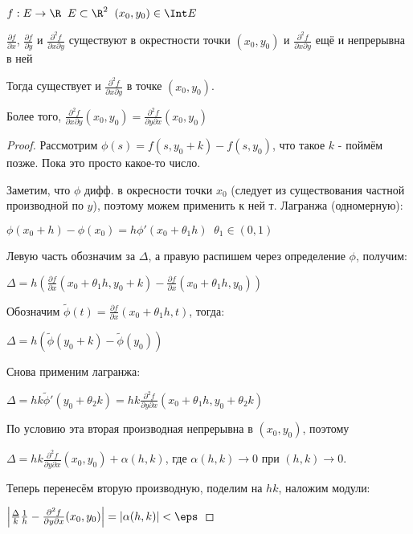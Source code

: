 \begin{theorem}\slashns
	
	$f: E \to \R \;\; E\subset \R^2 \;\; (x_0, y_0)  \in \Int E$
	
	$\frac{\partial f}{\partial x} $,
	$\frac{\partial f}{\partial y} $ и 
	$\frac{\partial^2 f}{\partial x \partial y} $ 
	существуют в окрестности точки $(x_0, y_0)$ и $\frac{\partial^2 f}{\partial x \partial y} $ ещё и непрерывна в ней
	
	
	Тогда существует и $\frac{\partial^2 f}{\partial x \partial y}$ в точке $(x_0, y_0)$. 

	Более того, $\frac{\partial^2 f}{\partial x \partial y}(x_0, y_0) = \frac{\partial^2 f}{\partial y \partial x}(x_0, y_0)$
\end{theorem}

\begin{proof}\slashns

	Рассмотрим $\phi(s) = f(s, y_0 + k) - f(s, y_0)$, что такое $k$ - поймём позже. Пока это просто какое-то число.

	Заметим, что $\phi$ дифф. в окресности точки $x_0$ (следует из существования частной производной по $y$), поэтому можем применить к ней т. Лагранжа (одномерную):
	
	$\phi(x_0 + h) - \phi(x_0) = h \phi'(x_0 + \theta_1 h) \;\; \theta_1 \in (0,1)$

	Левую часть обозначим за $\Delta$, а правую распишем через определение $\phi$, получим:

	$\Delta = h(\frac{\partial f}{\partial x} (x_0 + \theta_1 h, y_0 + k) - \frac{\partial f}{\partial x}(x_0 + \theta_1h, y_0)) $

	Обозначим $\tilde{\phi}(t) = \frac{\partial f}{\partial x} (x_0 + \theta_1 h, t)$, тогда:

	$\Delta = h(\tilde{\phi}(y_0+k) - \tilde{\phi}(y_0))$

	Снова применим лагранжа:

	$\Delta = hk\tilde{\phi}'(y_0 + \theta_2 k) = hk \frac{\partial^2 f}{\partial y \partial x} (x_0 + \theta_1 h, y_0 + \theta_2 k)$

	По условию эта вторая производная непрерывна в $(x_0, y_0)$, поэтому

	$\Delta = hk \frac{\partial^2 f}{\partial y \partial x} (x_0, y_0 ) + \alpha(h, k)$, где $\alpha(h, k)\to0$ при $(h,k)\to0$.
	
	Теперь перенесём вторую производную, поделим на $hk$, наложим модули:

	$\left|\frac{\Delta}{k}\frac{1}{h} - \frac{\partial^2 f}{\partial y \partial x} (x_0, y_0 )\right|=|\alpha(h, k)|<\eps$


\end{proof}
